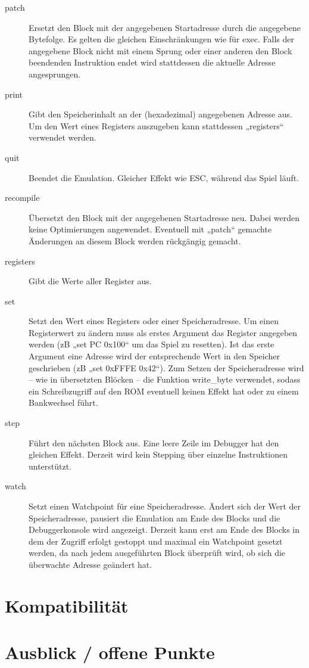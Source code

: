 \documentclass[a4paper]{scrartcl}
\begin{document}
\begin{description}
\item[patch] Ersetzt den Block mit der angegebenen Startadresse durch die angegebene Bytefolge. Es gelten die gleichen Einschränkungen wie für exec. Falls der angegebene Block nicht mit einem Sprung oder einer anderen den Block beendenden Instruktion endet wird stattdessen die aktuelle Adresse angesprungen.
\item[print] Gibt den Speicherinhalt an der (hexadezimal) angegebenen Adresse aus. Um den Wert eines Registers auszugeben kann stattdessen „registers“ verwendet werden.
\item[quit] Beendet die Emulation. Gleicher Effekt wie ESC, während das Spiel läuft.
\item[recompile] Übersetzt den Block mit der angegebenen Startadresse neu. Dabei werden keine Optimierungen angewendet. Eventuell mit „patch“ gemachte Änderungen an diesem Block werden rückgängig gemacht.
\item[registers] Gibt die Werte aller Register aus.
\item[set] Setzt den Wert eines Registers oder einer Speicheradresse. Um einen Registerwert zu ändern muss als erstes Argument das Register angegeben werden (zB „set PC 0x100“ um das Spiel zu resetten). Ist das erste Argument eine Adresse wird der entsprechende Wert in den Speicher geschrieben (zB „set 0xFFFE 0x42“). Zum Setzen der Speicheradresse wird -- wie in übersetzten Blöcken -- die Funktion write\_byte verwendet, sodass ein Schreibzugriff auf den ROM eventuell keinen Effekt hat oder zu einem Bankwechsel führt.
\item[step] Führt den nächsten Block aus. Eine leere Zeile im Debugger hat den gleichen Effekt. Derzeit wird kein Stepping über einzelne Instruktionen unterstützt.
\item[watch] Setzt einen Watchpoint für eine Speicheradresse. Ändert sich der Wert der Speicheradresse, pausiert die Emulation am Ende des Blocks und die Debuggerkonsole wird angezeigt. Derzeit kann erst am Ende des Blocks in dem der Zugriff erfolgt gestoppt und maximal ein Watchpoint gesetzt werden, da nach jedem ausgeführten Block überprüft wird, ob sich die überwachte Adresse geändert hat.
\end{description}
\section{Kompatibilität}
\section{Ausblick / offene Punkte}



\end{document}

